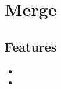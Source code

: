 \section{Merge}
\label{module:Merge}
\AvailableInJavaAndCsharp{\TODO}
\subsection{Features}
\begin{itemize}
	\item {}
	\item {}
\end{itemize}
